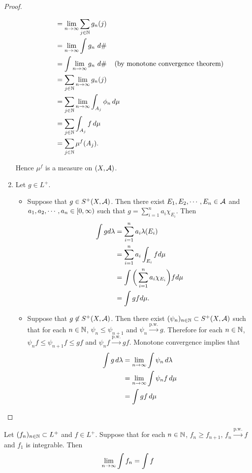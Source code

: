 \documentclass{book}
\begin{document}
\begin{proof}
\begin{enumerate}
\begin{itemize}
\begin{align*}
					& = \lim \limits_{n \rightarrow \infty} \sum_{j \in \mathbb{N}} g_n(j) \\
					& = \lim \limits_{n \rightarrow \infty} \int g_n \, \, d \# \\
					& = \int \lim \limits_{n \rightarrow \infty} g_n \, \, d \# \hspace{4mm} \text{(by monotone convergence theorem)} \\ 
					& = \sum_{j \in \mathbb{N}} \lim \limits_{n \rightarrow \infty} g_n(j) \\
					& = \sum_{j \in \mathbb{N}} \lim \limits_{n \rightarrow \infty} \int_{A_j} \phi_n \, d \mu  \\
					& = \sum_{j \in \mathbb{N}} \int_{A_j} f \, d \mu \\
					& = \sum_{j \in \mathbb{N}} \mu^f(A_j).
				\end{align*} 
			\end{itemize}
			Hence $\mu^f$ is a measure on $(X, \mathcal{A})$.
			\item Let $g \in L^+$. 
			\begin{itemize}
				\item Suppose that $g \in S^+(X, \mathcal{A})$. Then there exist $E_1, E_2, \cdots, E_n \in \mathcal{A}$ and  $a_1, a_2, \cdots, a_n \in [0,\infty)$ such that $g = \sum\limits_{i=1}^n a_i \chi_{E_i}$. Then
				\begin{align*}
					\int g d\lambda 
					&= \sum_{i=1}^n a_i \lambda(E_i)\\
					&= \sum_{i=1}^n a_i \int_{E_i} f d\mu\\
					&= \int \bigg(\sum_{i=1}^n a_i\chi_{E_i} \bigg) f d\mu\\
					&= \int gf d\mu.
				\end{align*}
				\item Suppose that $g \not \in S^+(X, \mathcal{A})$. Then there exist $(\psi_n)_{n \in \mathbb{N}} \subset S^+(X, \mathcal{A})$ such that for each $n \in \mathbb{N}$, $\psi_n \leq \psi_{n+1}$ and $\psi_n \xrightarrow{\text{p.w.}} g$. Therefore for each $n \in \mathbb{N}$, $\psi_n f \leq \psi_{n+1}f \leq gf$ and $\psi_nf \xrightarrow{\text{p.w.}} gf$. Monotone convergence implies that
				\begin{align*}
					\int g \, d \lambda 
					&= \lim \limits_{n \rightarrow \infty} \int \psi_n \, d \lambda\\
					&= \lim \limits_{n \rightarrow \infty} \int \psi_n f \, d \mu \\
					&= \int g f \, d \mu 
				\end{align*}
			\end{itemize}
		\end{enumerate}
	\end{proof}

	
	
	\begin{ex} 
		Let $(f_n)_{n \in \mathbb{N}} \subset L^+$ and $f \in L^+$. Suppose that for each $n \in \mathbb{N}$, $f_n \geq f_{n+1}$, $f_n \xrightarrow{\text{p.w.}} f$ and $f_1$ is integrable. Then 
		$$\lim \limits_{n \rightarrow \infty} \int f_n = \int f$$
	\end{ex}
	
\end{document}
